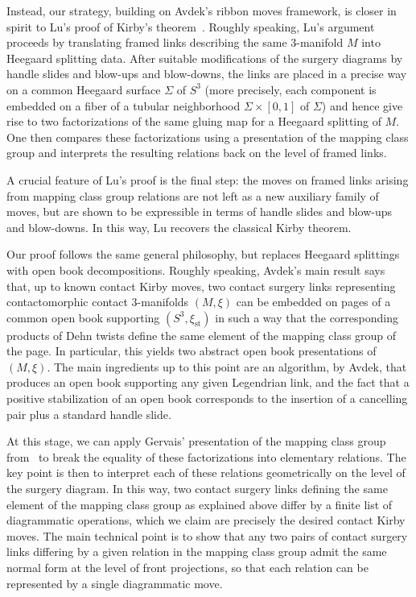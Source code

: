 \documentclass{amsart}
\numberwithin{equation}{section}
\numberwithin{figure}{section}
\theoremstyle{definition}
\theoremstyle{remark}
\let\oldSigma\Sigma
\renewcommand{\Sigma}{\oldSigma}
\let\olddxi\xi %
\renewcommand{\xi}{\olddxi}
\newcommand{\xist}{\olddxi_{\mathrm{st}}}
\begin{document}
Instead, our strategy, building on Avdek's ribbon moves framework, is closer in spirit to Lu's proof of Kirby's theorem~\cite{Lu_Kirbystheorem}. Roughly speaking, Lu's argument proceeds by translating framed links describing the same $3$-manifold $M$ into Heegaard splitting data. After suitable modifications of the surgery diagrams by handle slides and blow-ups and blow-downs, the links are placed in a precise way on a common Heegaard surface $\Sigma$ of $S^3$ (more precisely, each component is embedded on a fiber of a tubular neighborhood $\Sigma\times[0,1]$ of $\Sigma$) and hence give rise to two factorizations of the same gluing map for a Heegaard splitting of $M$. One then compares these factorizations using a presentation of the mapping class group and interprets the resulting relations back on the level of framed links.

A crucial feature of Lu's proof is the final step: the moves on framed links arising from mapping class group relations are not left as a new auxiliary family of moves, but are shown to be expressible in terms of handle slides and blow-ups and blow-downs. In this way, Lu recovers the classical Kirby theorem.

Our proof follows the same general philosophy, but replaces Heegaard splittings with open book decompositions. Roughly speaking, Avdek's main result says that, up to known contact Kirby moves, two contact surgery links representing contactomorphic contact $3$-manifolds $(M,\xi)$ can be embedded on pages of a common open book supporting $(S^3,\xist)$ in such a way that the corresponding products of Dehn twists define the same element of the mapping class group of the page. In particular, this yields two abstract open book presentations of $(M,\xi)$. The main ingredients up to this point are an algorithm, by Avdek, that produces an open book supporting any given Legendrian link, and the fact that a positive stabilization of an open book corresponds to the insertion of a cancelling pair plus a standard handle slide.

At this stage, we can apply Gervais' presentation of the mapping class group from~\cite{Gervais} to break the equality of these factorizations into elementary relations. The key point is then to interpret each of these relations geometrically on the level of the surgery diagram. In this way, two contact surgery links defining the same element of the mapping class group as explained above differ by a finite list of diagrammatic operations, which we claim are precisely the desired contact Kirby moves. The main technical point is to show that any two pairs of contact surgery links differing by a given relation in the mapping class group admit the same normal form at the level of front projections, so that each relation can be represented by a single diagrammatic move.
\end{document}
